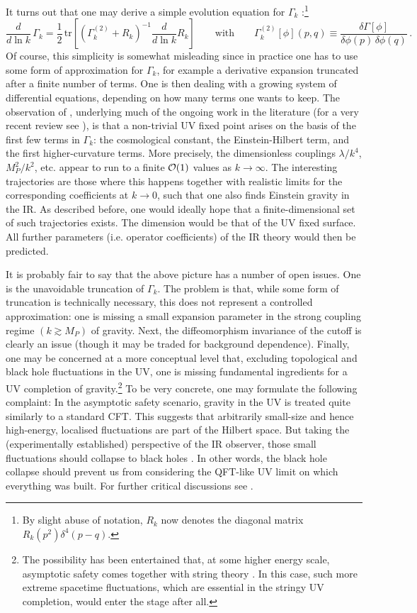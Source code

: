 \documentclass[12pt]{article}
\newcommand{\be}{\begin{equation}}
\newcommand{\ee}{\end{equation}}
\numberwithin{equation}{section}
\begin{document}
It turns out that one may derive a simple evolution equation for $\Gamma_k$ \cite{Wetterich:1992yh}:\footnote{By
slight abuse of notation, $R_k$ now denotes the diagonal matrix $R_k(p^2)\delta^4(p-q)$.}
\be
\frac{d}{d\ln k}\,\Gamma_k=\frac{1}{2}\,\mbox{tr}\left[\left(\Gamma^{(2)}_k+R_k\right)^{-1}\!\frac{d}{d\ln k}R_k\right]\qquad\mbox{with}\qquad
\Gamma_k^{(2)}[\phi](p,q)\equiv \frac{\delta \Gamma[\phi]}{\delta\phi(p)\,\delta\phi(q)}\,.
\ee
Of course, this simplicity is somewhat misleading since in practice one has to use some form of approximation for $\Gamma_k$, for example a derivative expansion truncated after a finite number of terms. One is then dealing with a growing system of differential equations, depending on how many terms one wants to keep. The observation of \cite{Reuter:1996cp}, underlying much of the ongoing work in the literature (for a very recent review see \cite{Bonanno:2020bil}), is that a non-trivial UV fixed point arises on the basis of the first few terms in $\Gamma_k$: the cosmological constant, the Einstein-Hilbert term, and the first higher-curvature terms. More precisely, the dimensionless couplings $\lambda/k^4$, $M_P^2/k^2$, etc. appear to run to a finite ${\cal O}(1)$ values as $k\to \infty$. The interesting trajectories are those where this happens together with realistic limits for the corresponding coefficients at $k\to 0$, such that one also finds Einstein gravity in the IR. As described before, one would ideally hope that a finite-dimensional set of such trajectories exists. The dimension would be that of the UV fixed surface. All further parameters (i.e. operator coefficients) of the IR theory would then be predicted.

It is probably fair to say that the above picture has a number of open issues. One is the unavoidable truncation of $\Gamma_k$. The problem is that, while some form of truncation is technically necessary, this does not represent a controlled approximation: one is missing a small expansion parameter in the strong coupling regime $(k\gtrsim M_P)$ of gravity. Next, the diffeomorphism invariance of the cutoff is clearly an issue (though it may be traded for background dependence). Finally, one may be concerned at a more conceptual level that, excluding topological and black hole fluctuations in the UV, one is missing fundamental ingredients for a UV completion of gravity.\footnote{
The possibility has been entertained that, at some higher energy scale, asymptotic safety comes together with string theory \cite{deAlwis:2019aud}. In this case, such more extreme spacetime fluctuations, which are essential in the stringy UV completion, would enter the stage after all.
} 
To be very concrete, one may formulate the following complaint: In the asymptotic safety scenario, gravity in the UV is treated quite similarly to a standard CFT. This suggests that arbitrarily small-size and hence high-energy, localised fluctuations are part of the Hilbert space. But taking the (experimentally established) perspective of the IR observer, those small fluctuations should collapse to black holes  \cite{Dvali:2010bf, Dvali:2010jz, Dvali:2014ila}. In other words, the black hole collapse should prevent us from considering the QFT-like UV limit on which everything was built. For further critical discussions see \cite{Donoghue:2019clr}.
\end{document}
